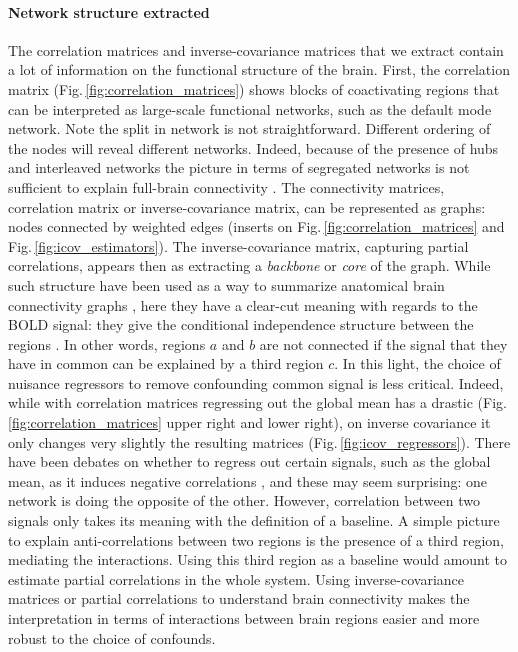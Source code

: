 \documentclass[5p]{elsarticle}
\begin{document}
\paragraph{Network structure extracted}
%
The correlation matrices and inverse-covariance matrices that we extract
contain a lot of information on the functional structure of the brain.
First, the correlation matrix (Fig.\,\ref{fig:correlation_matrices})
shows blocks of coactivating regions that can be interpreted as
large-scale functional networks, such as the default mode network. Note
the split in network is not straightforward. Different ordering of the
nodes will reveal different networks. Indeed, because of the presence of
hubs and interleaved networks the picture in terms of segregated networks
is not sufficient to explain full-brain connectivity
\cite{varoquaux2012}. The connectivity matrices, correlation matrix or
inverse-covariance matrix, can be represented as graphs: nodes connected
by weighted edges (inserts on Fig.\,\ref{fig:correlation_matrices} and
Fig.\,\ref{fig:icov_estimators}). The inverse-covariance matrix,
capturing partial correlations, appears then as extracting a
\emph{backbone} or \emph{core} of the graph. While such structure have
been used as a way to summarize anatomical brain connectivity graphs
\cite{hagmann2008}, here they have a clear-cut meaning with regards to
the BOLD signal: they give the conditional independence structure between
the regions \cite{varoquaux2012}. In other words, regions $a$ and $b$ are
not connected if the signal that they have in common can be explained by
a third region $c$. In this light, the choice of nuisance regressors to
remove confounding common signal is less critical. Indeed, while with
correlation matrices regressing out the global mean has a drastic
(Fig.\,\ref{fig:correlation_matrices} upper right and lower right), on
inverse covariance it only changes very slightly the resulting matrices
(Fig.\,\ref{fig:icov_regressors}). There have been debates on whether to
regress out certain signals, such as the global mean,  as it induces
negative correlations \cite{murphy2009,chang2009,fox2009}, and these may seem
surprising: one network is doing the opposite of the other. However,
correlation between two signals only takes its meaning with the
definition of a baseline. A simple picture to explain anti-correlations
between two regions is the presence of a third region, mediating the
interactions. Using this third region as a baseline would amount to
estimate partial correlations in the whole system. Using 
inverse-covariance matrices or partial correlations to understand brain
connectivity makes the interpretation in terms of interactions between
brain regions easier and more robust to the choice of confounds.
\end{document}
